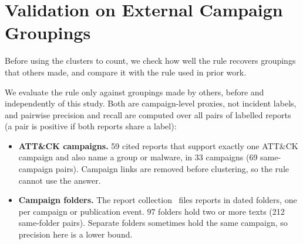 \documentclass[runningheads]{llncs}
\newcommand{\attack}{ATT\&CK}
\begin{document}
\section{Validation on External Campaign Groupings}\label{sec:val}

Before using the clusters to count, we check how well the rule recovers groupings that others made, and compare it with the rule used in prior work.

We evaluate the rule only against groupings made by others, before and independently of this study. Both are campaign-level proxies, not incident labels, and pairwise precision and recall are computed over all pairs of labelled reports (a pair is positive if both reports share a label):

\begin{itemize}
\item \textbf{\attack{} campaigns.} 59 cited reports that support exactly one \attack{} campaign and also name a group or malware, in 33 campaigns (69 same-campaign pairs). Campaign links are removed before clustering, so the rule cannot use the answer.
\item \textbf{Campaign folders.} The report collection~\cite{cybermonitor2024apt} files reports in dated folders, one per campaign or publication event. 97 folders hold two or more texts (212 same-folder pairs). Separate folders sometimes hold the same campaign, so precision here is a lower bound.
\end{itemize}
\end{document}
